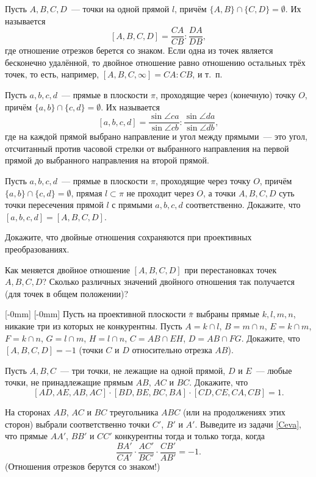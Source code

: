 \documentclass[a4paper,12pt]{article}
\newcommand{\rightpicture}[4]%
{\ifthenelse{\lengthtest{10mm>#3mm}}%
{\marginnote{\hbox to #1 {\hss\texttt{[image: \#4]}}}[-#2]}%
{\marginnote{\hbox to #1 {\hss\texttt{[image: \#4]}}}[-#2]}}
\begin{document}


 Пусть $A,B,C,D$~--- точки на одной прямой $l$, причём
$\{A,B\}\cap\{C,D\} = \emptyset$. Их 
называется
  $$
  [A,B,C,D] = \frac{CA}{CB}:\frac{DA}{DB},
  $$
где отношение отрезков берется со знаком. Если одна из точек
является бесконечно удалённой, то двойное отношение равно
 отношению остальных трёх точек, то есть, например,
$[A,B,C,\infty] = CA : CB$, и т.~п.

Пусть $a,b,c,d$~--- прямые в плоскости $\pi$, проходящие через
(конечную) точку $O$, причём $\{a,b\}\cap\{c,d\} = \emptyset$. Их
 называется
  $$
  [a,b,c,d] = \frac{\sin\angle ca}{\sin\angle cb} : \frac{\sin\angle
  da}{\sin\angle db},
  $$
где на каждой прямой выбрано направление и угол между прямыми~---
это угол, отсчитанный против часовой стрелки от выбранного
направления на первой прямой до выбранного направления на второй
прямой. 

 Пусть $a,b,c,d$~--- прямые в плоскости $\pi$, проходящие
через точку $O$, причём\break $\{a,b\}\cap\{c,d\} = \emptyset$,
прямая $l\subset\pi$ не проходит через $O$, а точки $A,B,C,D$ суть
точки пересечения прямой $l$ с прямыми $a,b,c,d$ соответственно.
Докажите, что $[a,b,c,d] = [A,B,C,D]$. 

 Докажите, что двойные отношения сохраняются при проективных
преобразованиях. 

 Как меняется двойное отношение $[A,B,C,D]$ при перестановках
точек $A,B,C,D$? Сколько различных значений двойного отношения так
получается (для точек в общем положении)? 

\rightpicture{0mm}{0mm}{75mm}{proj_geom-5}
 Пусть на проективной
плоскости $\bar\pi$ выбраны прямые $k,l,m,n$, никакие три из которых
не конкурентны. Пусть $A = k\cap l$, $B = m\cap n$, $E = k\cap m$,
$F = k\cap n$, $G = l\cap m$, $H = l\cap n$, $C = AB\cap EH$, $D =
AB\cap FG$. Докажите, что $[A,B,C,D] = -1$ (точки $C$ и $D$
 относительно отрезка $AB$). 

\label{Ceva} Пусть $A,B,C$~--- три
точки, не лежащие на одной прямой, $D$ и $E$~--- любые точки, не
принадлежащие прямым $AB$, $AC$ и $BC$. Докажите, что
  $$
  [AD,AE,AB,AC] \cdot [BD,BE,BC,BA] \cdot [CD,CE,CA,CB] = 1.
  $$

 На сторонах $AB$, $AC$ и $BC$ треугольника
$ABC$ (или на продолжениях этих сторон) выбрали соответственно точки
$C'$, $B'$ и $A'$. Выведите из задачи \ref{Ceva}, что прямые $AA'$,
$BB'$ и $CC'$ конкурентны тогда и только тогда, когда
  $$
  \frac{BA'}{CA'} \cdot \frac{AC'}{BC'} \cdot \frac{CB'}{AB'} = -1.
  $$
(Отношения отрезков берутся со знаком!) 
\end{document}
